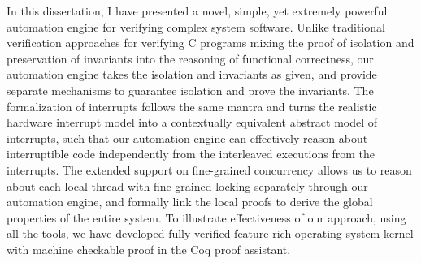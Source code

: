 \label{chapt:concl}

In this dissertation, I have presented a novel, simple, yet extremely powerful
automation engine for verifying complex system software.
Unlike traditional verification approaches for verifying C programs mixing 
the proof of isolation and preservation of invariants into the reasoning of 
functional correctness, our automation engine takes the isolation and 
invariants as given, and provide separate mechanisms to guarantee 
isolation and prove the invariants.
The formalization of interrupts follows the
same mantra and turns the realistic hardware interrupt model into
a contextually equivalent abstract model of interrupts,
such that our automation engine can effectively reason about interruptible
code independently from the interleaved executions from the interrupts.
The extended support on fine-grained concurrency allows us
to reason about each local thread with fine-grained locking separately through
our automation engine,
and formally link the local proofs to derive the global properties of
the entire system. 
To illustrate effectiveness of our approach, using all the tools, we 
have developed fully verified feature-rich operating system kernel 
with machine checkable proof in the Coq proof assistant.

